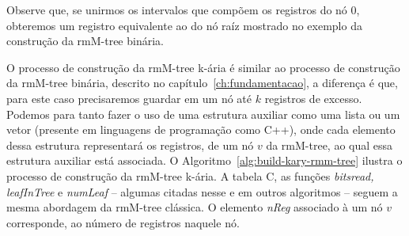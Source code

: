 \begin{example}
        Observe que, se unirmos os intervalos que compõem os registros do nó $0$, obteremos um registro equivalente ao do nó raíz mostrado no exemplo da construção da rmM-tree binária.
\end{example}

O processo de construção da rmM-tree k-ária é similar ao processo de construção da rmM-tree binária, descrito no capítulo~\ref{ch:fundamentacao}, a diferença é que, para este caso precisaremos guardar em um nó até $k$ registros de excesso. Podemos para tanto fazer o uso de uma estrutura auxiliar como uma lista ou um vetor (presente em linguagens de programação como C++), onde cada elemento dessa estrutura representará os registros, de um nó $v$ da rmM-tree, ao qual essa estrutura auxiliar está associada. O Algoritmo~\ref{alg:build-kary-rmm-tree} ilustra o processo de construção da rmM-tree k-ária. A tabela C, as funções \textit{bitsread, leafInTree} e \textit{numLeaf} -- algumas citadas nesse e em outros algoritmos -- seguem a mesma abordagem da rmM-tree clássica. O elemento \textit{nReg} associado à um nó $v$ corresponde, ao número de registros naquele nó.
